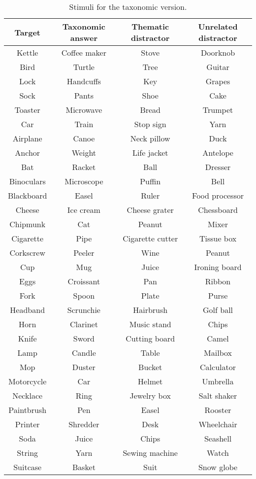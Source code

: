 \documentclass[../dissertation.tex]{subfiles}
\begin{document}
\begin{table}[H]
\caption{Stimuli for the taxonomic version.}
\vspace{-10pt}
\begin{center}
\begin{tabular}{cccc}
\toprule
Target & Taxonomic answer & Thematic distractor & Unrelated distractor \\
\midrule
Kettle & Coffee maker & Stove & Doorknob \\
Bird & Turtle & Tree & Guitar \\
Lock & Handcuffs & Key & Grapes \\
Sock & Pants & Shoe & Cake \\
Toaster & Microwave & Bread & Trumpet \\
Car & Train & Stop sign & Yarn \\
Airplane & Canoe & Neck pillow & Duck \\
Anchor & Weight & Life jacket & Antelope \\
Bat & Racket & Ball & Dresser \\
Binoculars & Microscope & Puffin & Bell \\
Blackboard & Easel & Ruler & Food processor \\
Cheese & Ice cream & Cheese grater & Chessboard \\
Chipmunk & Cat & Peanut & Mixer \\
Cigarette & Pipe & Cigarette cutter & Tissue box \\
Corkscrew & Peeler & Wine & Peanut \\
Cup & Mug & Juice & Ironing board \\
Eggs & Croissant & Pan & Ribbon \\
Fork & Spoon & Plate & Purse \\
Headband & Scrunchie & Hairbrush & Golf ball \\
Horn & Clarinet & Music stand & Chips \\
Knife & Sword & Cutting board & Camel \\
Lamp & Candle & Table & Mailbox \\
Mop & Duster & Bucket & Calculator \\
Motorcycle & Car & Helmet & Umbrella \\
Necklace & Ring & Jewelry box & Salt shaker \\
Paintbrush & Pen & Easel & Rooster \\
Printer & Shredder & Desk & Wheelchair \\
Soda & Juice & Chips & Seashell \\
String & Yarn & Sewing machine & Watch \\
Suitcase & Basket & Suit & Snow globe \\
\bottomrule
\end{tabular}
\label{taxstim}
\end{center}
\end{table}
\end{document}
